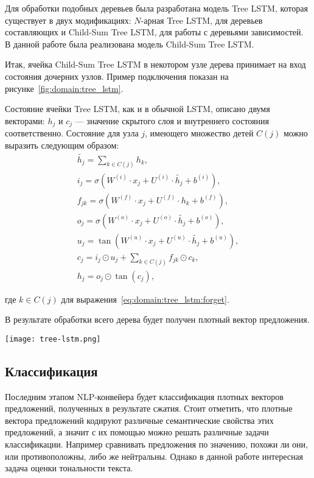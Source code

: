 Для обработки подобных деревьев была разработана модель Tree LSTM, которая существует в двух модификациях: $N$-арная Tree LSTM, для деревьев составляющих и Child-Sum Tree LSTM, для работы с деревьями зависимостей. В данной работе была реализована модель Child-Sum Tree LSTM\cite{tree_lstm}.

Итак, ячейка Child-Sum Tree LSTM в некотором узле дерева принимает на вход состояния дочерних узлов. Пример подключения показан на рисунке~\ref{fig:domain:tree_lstm}.

Состояние ячейки Tree LSTM, как и в обычной LSTM, описано двумя векторами: $h_j$ и $c_j$ --- значение скрытого слоя и внутреннего состояния соответственно. Состояние для узла $j$, имеющего множество детей $C(j)$ можно выразить следующим образом:
\begin{gather}
  \tilde{h_j} = \sum_{k\in{C(j)}}h_k,\\
  \label{eq:domain:tree_lstm:i}
  i_j = \sigma(W^{(i)}\cdot{x_j} + U^{(i)}\cdot{\tilde{h_j}} + b^{(i)}),\\
  \label{eq:domain:tree_lstm:forget}
  f_{jk} = \sigma(W^{(f)}\cdot{x_j} + U^{(f)}\cdot{h_k} + b^{(f)}),\\
  \label{eq:domain:tree_lstm:o}
  o_j = \sigma(W^{(o)}\cdot{x_j} + U^{(o)}\cdot{\tilde{h_j}} + b^{(o)}),\\
  \label{eq:domain:tree_lstm:u}
  u_j = \tan(W^{(u)}\cdot{x_j} + U^{(u)}\cdot{\tilde{h_j}} + b^{(u)}),\\
  c_j = i_j\odot{u_j} + \sum_{k\in{C(j)}}f_{jk}\odot{c_k},\\
  h_j = o_j\odot{\tan(c_j)},
\end{gather}
\begin{explanationx}
\item [где] $k\in{C(j)}$ для выражения~\ref{eq:domain:tree_lstm:forget}.
\end{explanationx}

В результате обработки всего дерева будет получен плотный вектор предложения.

\begin{center}
  \texttt{[image: tree-lstm.png]}
  \label{fig:domain:tree_lstm}
\end{center}

\subsection{Классификация}
Последним этапом NLP-конвейера будет классификация плотных векторов предложений, полученных в результате сжатия. Стоит отметить, что плотные вектора предложений кодируют различные семантические свойства этих предложений, а значит с их помощью можно решать различные задачи классификации. Например сравнивать предложения по значению, похожи ли они, или противоположны, либо же нейтральны. Однако в данной работе интересная задача оценки тональности текста\cite{Goodfellow-et-al-2016}.

